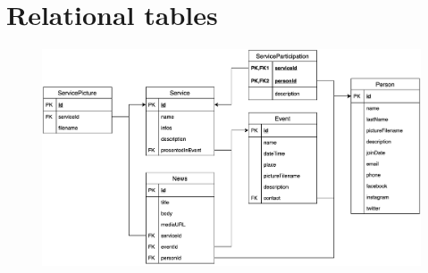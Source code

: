 \documentclass[a4paper, 11pt, parskip=half, headsepline]{scrreprt}
\begin{document}
\section{Relational tables}

\begin{figure}[H]
    \centering
    \includegraphics[width=0.72\linewidth, keepaspectratio]{DB/RelationalTables}
\end{figure}
\end{document}
